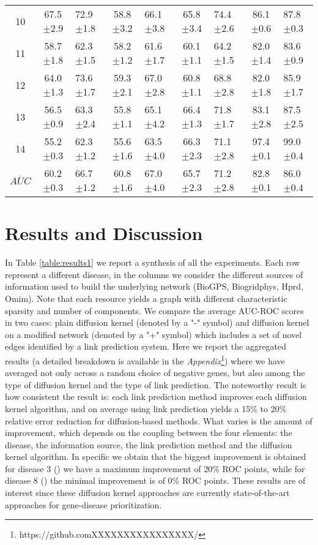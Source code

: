 {\begin{table*}[!htbp]
\begin{tabular}{|c|c|g|c|g|c|g|c|g|}
10 & 67.5$\pm$2.9 & 72.9$\pm$1.8 & 58.8$\pm$3.2 & 66.1$\pm$3.8 & 65.8$\pm$3.4 & 74.4$\pm$2.6 & 86.1$\pm$0.6 & 87.8$\pm$0.3 \\
11 & 58.7$\pm$1.8 & 62.3$\pm$1.5 & 58.2$\pm$1.2 & 61.6$\pm$1.7 & 60.1$\pm$1.1 & 64.2$\pm$1.5 & 82.0$\pm$1.4 & 83.6$\pm$0.9 \\
12 & 64.0$\pm$1.3 & 73.6$\pm$1.7 & 59.3$\pm$2.1 & 67.0$\pm$2.8 & 60.8$\pm$1.1 & 68.8$\pm$2.8 & 82.0$\pm$1.8 & 85.9$\pm$1.7 \\
13 & 56.5$\pm$0.9 & 63.3$\pm$2.4 & 55.8$\pm$1.1 & 65.1$\pm$4.2 & 66.4$\pm$1.3 & 71.8$\pm$1.7 & 83.1$\pm$2.8 & 87.5$\pm$2.5 \\
14 & 55.2$\pm$0.3 & 62.3$\pm$1.2 & 55.6$\pm$1.6 & 63.5$\pm$4.0 & 66.3$\pm$2.3 & 71.1$\pm$2.8 & 97.4$\pm$0.1 & 99.0$\pm$0.4 \\
\hline
$\overline{AUC}$ & 60.2$\pm$0.3 & 66.7$\pm$1.2 & 60.8$\pm$1.6 & 67.0$\pm$4.0 & 65.7$\pm$2.3 & 71.2$\pm$2.8 & 82.8$\pm$0.1 & 86.0$\pm$0.4 \\
\hline
\end{tabular}
\end{table*}

\section{Results and Discussion}
\label{results-discussion}

In Table \ref{table:results1} we report a synthesis of all the experiments.
Each row represent a different disease, in the columns we consider the
different sources of information used to build the underlying network (BioGPS,
Biogridphys, Hprd, Omim). Note that each resource yields a graph with
different characteristic sparsity and number of components. We compare the
average AUC-ROC scores in two cases: plain diffusion kernel (denoted by a "-"
symbol) and diffusion kernel on a modified network (denoted by a "+" symbol)
which includes a set of novel edges identified by a link prediction system.
Here we report the aggregated results (a detailed breakdown is available in
the \textit{Appendix}\footnote{https://github.comXXXXXXXXXXXXXXXX/}) where we
have averaged not only across a random choice of negative genes, but also
among the type of diffusion kernel and the type of link prediction. The
noteworthy result is how consistent the result is: each link prediction method
improves each diffusion kernel algorithm, and on average using link prediction
yields a 15\% to 20\% relative error reduction for diffusion-based methods.
What varies is the amount of improvement, which depends on the coupling
between the four elements: the disease, the information source, the link
prediction method and the diffusion kernel algorithm. In specific we obtain
that the biggest improvement is obtained for disease 3 () we have a maximum
improvement of 20\% ROC points, while for disease 8 () the minimal improvement is
of 0\% ROC points. These results are of interest since these diffusion kernel
approaches are currently state-of-the-art approaches for gene-disease
prioritization.

}
